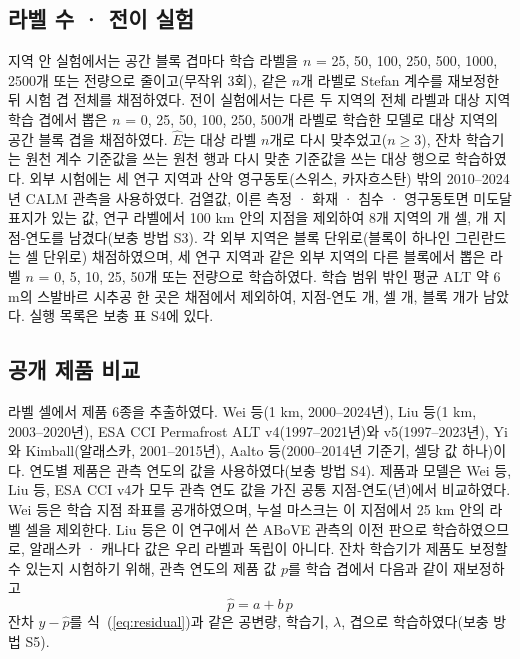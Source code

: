 \subsection{라벨 수 · 전이 실험}
지역 안 실험에서는 공간 블록 겹마다 학습 라벨을 $n$ = 25, 50, 100, 250, 500, 1000, 2500개 또는 전량으로 줄이고(무작위 3회), 같은 $n$개 라벨로 Stefan 계수를 재보정한 뒤 시험 겹 전체를 채점하였다. 전이 실험에서는 다른 두 지역의 전체 라벨과 대상 지역 학습 겹에서 뽑은 $n$ = 0, 25, 50, 100, 250, 500개 라벨로 학습한 모델로 대상 지역의 공간 블록 겹을 채점하였다. $\hat{E}$는 대상 라벨 $n$개로 다시 맞추었고($n\geq3$), 잔차 학습기는 원천 계수 기준값을 쓰는 원천 행과 다시 맞춘 기준값을 쓰는 대상 행으로 학습하였다. 외부 시험에는 세 연구 지역과 산악 영구동토(스위스, 카자흐스탄) 밖의 2010--2024년 CALM 관측\cite{Streletskiy2025}을 사용하였다. 검열값, 이른 측정 · 화재 · 침수 · 영구동토면 미도달 표지가 있는 값, 연구 라벨에서 100 km 안의 지점을 제외하여 8개 지역의 \nextcells{}개 셀, \nextcy{}개 지점-연도를 남겼다(보충 방법 S3). 각 외부 지역은 블록 단위로(블록이 하나인 그린란드는 셀 단위로) 채점하였으며, 세 연구 지역과 같은 외부 지역의 다른 블록에서 뽑은 라벨 $n$ = 0, 5, 10, 25, 50개 또는 전량으로 학습하였다. 학습 범위 밖인 평균 ALT 약 6 m의 스발바르 시추공 한 곳은 채점에서 제외하여, 지점-연도 \nftScoredRows{}개, 셀 \nftScoredCells{}개, 블록 \nftScoredBlocks{}개가 남았다. 실행 목록은 보충 표 S4에 있다.

\subsection{공개 제품 비교}
라벨 셀에서 제품 6종을 추출하였다. Wei 등\cite{Wei2026}(1 km, 2000--2024년), Liu 등\cite{Liu2024}(1 km, 2003--2020년), ESA CCI Permafrost ALT v4(1997--2021년)와 v5(1997--2023년)\cite{Westermann2024,Westermann2025}, Yi와 Kimball\cite{YiKimball2019}(알래스카, 2001--2015년), Aalto 등\cite{Aalto2018}(2000--2014년 기준기, 셀당 값 하나)이다. 연도별 제품은 관측 연도의 값을 사용하였다(보충 방법 S4). 제품과 모델은 Wei 등, Liu 등, ESA CCI v4가 모두 관측 연도 값을 가진 공통 지점-연도(\nyrscc{}년)에서 비교하였다. Wei 등은 학습 지점 좌표를 공개하였으며, 누설 마스크는 이 지점에서 25 km 안의 라벨 셀을 제외한다. Liu 등은 이 연구에서 쓴 ABoVE 관측의 이전 판으로 학습하였으므로\cite{Liu2024}, 알래스카 · 캐나다 값은 우리 라벨과 독립이 아니다. 잔차 학습기가 제품도 보정할 수 있는지 시험하기 위해, 관측 연도의 제품 값 $p$를 학습 겹에서 다음과 같이 재보정하고
\begin{equation}
\hat{p} = a + b\, p
\label{eq:prod}
\end{equation}
잔차 $y-\hat{p}$를 식~(\ref{eq:residual})과 같은 공변량, 학습기, $\lambda$, 겹으로 학습하였다(보충 방법 S5).

